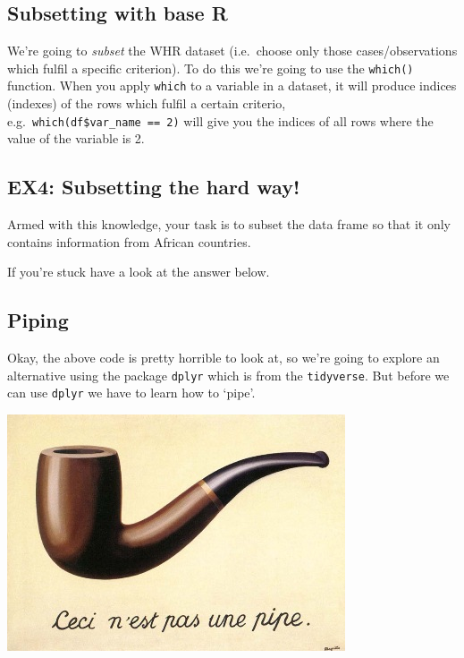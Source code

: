 \documentclass[]{article}
\newenvironment{Shaded}{\begin{snugshade}}{\end{snugshade}}
\newcommand{\FunctionTok}[1]{\textcolor[rgb]{0.00,0.00,0.00}{#1}}
\newcommand{\NormalTok}[1]{#1}
\newcommand{\OtherTok}[1]{\textcolor[rgb]{0.56,0.35,0.01}{#1}}
\newcommand{\SpecialCharTok}[1]{\textcolor[rgb]{0.00,0.00,0.00}{#1}}
\newcommand{\StringTok}[1]{\textcolor[rgb]{0.31,0.60,0.02}{#1}}
\begin{document}
\hypertarget{subsetting-with-base-r}{%
\subsection{Subsetting with base R}\label{subsetting-with-base-r}}

We're going to \emph{subset} the WHR dataset (i.e.~choose only those
cases/observations which fulfil a specific criterion). To do this we're
going to use the \texttt{which()} function. When you apply
\texttt{which} to a variable in a dataset, it will produce indices
(indexes) of the rows which fulfil a certain criterio,
e.g.~\texttt{which(df\$var\_name\ ==\ 2)} will give you the indices of
all rows where the value of the variable is 2.

\hypertarget{ex4-subsetting-the-hard-way}{%
\subsection{EX4: Subsetting the hard
way!}\label{ex4-subsetting-the-hard-way}}

Armed with this knowledge, your task is to subset the data frame so that
it only contains information from African countries.

If you're stuck have a look at the answer below.

\begin{Shaded}
\end{Shaded}

\hypertarget{piping}{%
\subsection{Piping}\label{piping}}

Okay, the above code is pretty horrible to look at, so we're going to
explore an alternative using the package \texttt{dplyr} which is from
the \texttt{tidyverse}. But before we can use \texttt{dplyr} we have to
learn how to `pipe'.

\includegraphics{MagrittePipe.jpg}
\end{document}
